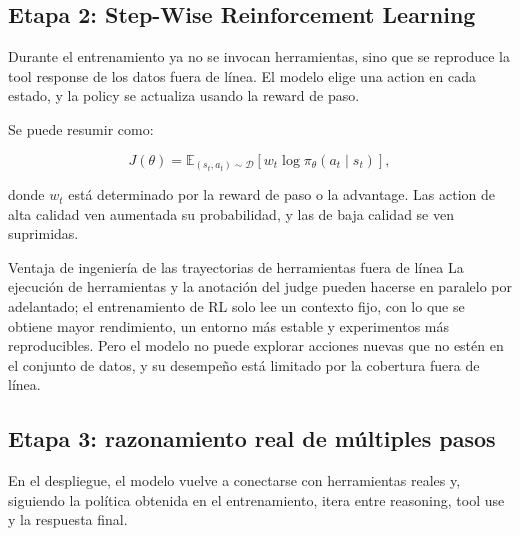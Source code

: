 \documentclass[a4paper]{article}
\begin{document}
\subsection{Etapa 2: Step-Wise Reinforcement Learning}

Durante el entrenamiento ya no se invocan herramientas, sino que se reproduce la tool response de los datos fuera de línea. El modelo elige una action en cada estado, y la policy se actualiza usando la reward de paso.



Se puede resumir como:

$$
J(\theta)=\mathbb E_{(s_t,a_t)\sim\mathcal D}
\left[w_t\log\pi_\theta(a_t\mid s_t)\right],
$$

donde $w_t$ está determinado por la reward de paso o la advantage. Las action de alta calidad ven aumentada su probabilidad, y las de baja calidad se ven suprimidas.

\begin{knowledgebox}{Ventaja de ingeniería de las trayectorias de herramientas fuera de línea}
La ejecución de herramientas y la anotación del judge pueden hacerse en paralelo por adelantado; el entrenamiento de RL solo lee un contexto fijo, con lo que se obtiene mayor rendimiento, un entorno más estable y experimentos más reproducibles. Pero el modelo no puede explorar acciones nuevas que no estén en el conjunto de datos, y su desempeño está limitado por la cobertura fuera de línea.
\end{knowledgebox}

\subsection{Etapa 3: razonamiento real de múltiples pasos}

En el despliegue, el modelo vuelve a conectarse con herramientas reales y, siguiendo la política obtenida en el entrenamiento, itera entre reasoning, tool use y la respuesta final.

\end{document}
